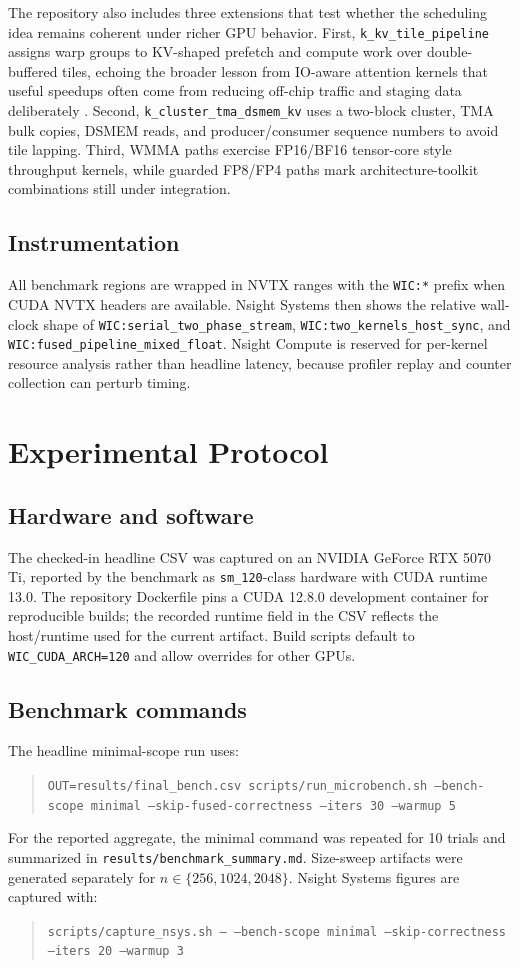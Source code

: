 \documentclass[11pt]{article}
\begin{document}
The repository also includes three extensions that test whether the scheduling idea remains coherent under richer GPU behavior. First, \texttt{k\_kv\_tile\_pipeline} assigns warp groups to KV-shaped prefetch and compute work over double-buffered tiles, echoing the broader lesson from IO-aware attention kernels that useful speedups often come from reducing off-chip traffic and staging data deliberately \cite{dao2022flashattention}. Second, \texttt{k\_cluster\_tma\_dsmem\_kv} uses a two-block cluster, TMA bulk copies, DSMEM reads, and producer/consumer sequence numbers to avoid tile lapping. Third, WMMA paths exercise FP16/BF16 tensor-core style throughput kernels, while guarded FP8/FP4 paths mark architecture-toolkit combinations still under integration.

\subsection{Instrumentation}
All benchmark regions are wrapped in NVTX ranges with the \texttt{WIC:*} prefix when CUDA NVTX headers are available. Nsight Systems then shows the relative wall-clock shape of \texttt{WIC:serial\_two\_phase\_stream}, \texttt{WIC:two\_kernels\_host\_sync}, and \texttt{WIC:fused\_pipeline\_mixed\_float}. Nsight Compute is reserved for per-kernel resource analysis rather than headline latency, because profiler replay and counter collection can perturb timing.

\section{Experimental Protocol}
\subsection{Hardware and software}
The checked-in headline CSV was captured on an NVIDIA GeForce RTX 5070 Ti, reported by the benchmark as \texttt{sm\_120}-class hardware with CUDA runtime 13.0. The repository Dockerfile pins a CUDA 12.8.0 development container for reproducible builds; the recorded runtime field in the CSV reflects the host/runtime used for the current artifact. Build scripts default to \texttt{WIC\_CUDA\_ARCH=120} and allow overrides for other GPUs.

\subsection{Benchmark commands}
The headline minimal-scope run uses:
\begin{quote}
\small
\texttt{OUT=results/final\_bench.csv scripts/run\_microbench.sh --bench-scope minimal --skip-fused-correctness --iters 30 --warmup 5}
\end{quote}
For the reported aggregate, the minimal command was repeated for 10 trials and summarized in \texttt{results/benchmark\_summary.md}. Size-sweep artifacts were generated separately for \(n \in \{256,1024,2048\}\). Nsight Systems figures are captured with:
\begin{quote}
\small
\texttt{scripts/capture\_nsys.sh -- --bench-scope minimal --skip-correctness --iters 20 --warmup 3}
\end{quote}
\end{document}
